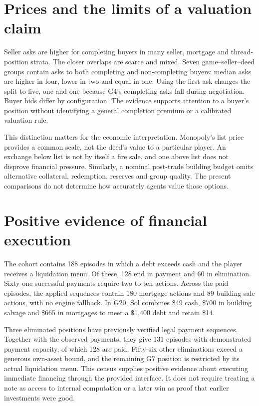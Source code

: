 \section*{Prices and the limits of a valuation claim}

Seller asks are higher for completing buyers in many seller, mortgage and
thread-position strata. The closer overlaps are scarce and mixed. Seven
game--seller--deed groups contain asks to both completing and non-completing
buyers: median asks are higher in four, lower in two and equal in one.
Using the first ask changes the split to five, one and one because G4's
completing asks fall during negotiation. Buyer bids differ by configuration.
The evidence supports attention to a buyer's position without identifying
a general completion premium or a calibrated valuation rule.

This distinction matters for the economic interpretation. Monopoly's list
price provides a common scale, not the deed's value to a particular player.
An exchange below list is not by itself a fire sale, and one above list does
not disprove financial pressure. Similarly, a nominal post-trade building
budget omits alternative collateral, redemption, reserves and group quality.
The present comparisons do not determine how accurately agents value those
options.

\section*{Positive evidence of financial execution}

The cohort contains 188 episodes in which a debt exceeds cash and the player
receives a liquidation menu. Of these, 128 end in payment and 60 in
elimination. Sixty-one successful payments require two to ten actions.
Across the paid episodes, the applied sequences contain 180 mortgage actions
and 89 building-sale actions, with no engine fallback. In G20, Sol combines
\$49 cash, \$700 in building salvage and \$665 in mortgages to meet a
\$1,400 debt and retain \$14.

Three eliminated positions have previously verified legal payment sequences.
Together with the observed payments, they give 131 episodes with demonstrated
payment capacity, of which 128 are paid. Fifty-six other eliminations exceed
a generous own-asset bound, and the remaining G7 position is restricted by
its actual liquidation menu. This census supplies positive evidence about
executing immediate financing through the provided interface. It does not
require treating a note as access to internal computation or a later win as
proof that earlier investments were good.

